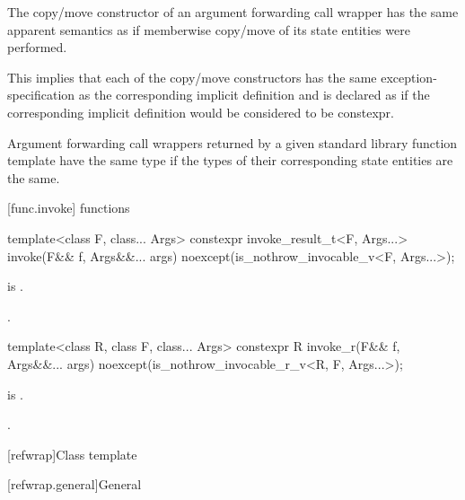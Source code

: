 \pnum
The copy/move constructor of an argument forwarding call wrapper has
the same apparent semantics
as if memberwise copy/move of its state entities
were performed.
\begin{note}
This implies that each of the copy/move constructors has
the same exception-specification as
the corresponding implicit definition and is declared as 
if the corresponding implicit definition would be considered to be constexpr.
\end{note}

\pnum
Argument forwarding call wrappers returned by
a given standard library function template have the same type
if the types of their corresponding state entities are the same.

[func.invoke]{ functions}
%
%
%
\begin{itemdecl}
template<class F, class... Args>
  constexpr invoke_result_t<F, Args...> invoke(F&& f, Args&&... args)
    noexcept(is_nothrow_invocable_v<F, Args...>);
\end{itemdecl}

\begin{itemdescr}
\pnum
\constraints
{} is .

\pnum
\returns
{}%
.
\end{itemdescr}

%
\begin{itemdecl}
template<class R, class F, class... Args>
  constexpr R invoke_r(F&& f, Args&&... args)
    noexcept(is_nothrow_invocable_r_v<R, F, Args...>);
\end{itemdecl}

\begin{itemdescr}
\pnum
\constraints
{} is .

\pnum
\returns
{}.
\end{itemdescr}

[refwrap]{Class template }

[refwrap.general]{General}

